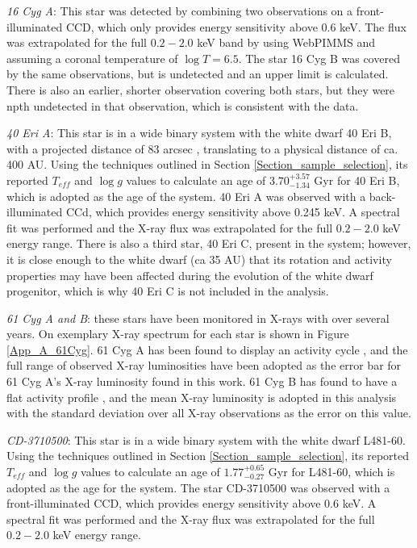 \textit{16 Cyg A}: This star was detected by combining two \Chandra observations on a front-illuminated CCD, which only provides energy sensitivity above 0.6 keV. The flux was extrapolated for the full $0.2 - 2.0$ keV band by using WebPIMMS and assuming a coronal temperature of $\log T = 6.5$. The star 16 Cyg B was covered by the same observations, but is undetected and an upper limit is calculated. There is also an earlier, shorter \XMM observation covering both stars, but they were npth undetected in that observation, which is consistent with the \Chandra data.

\textit{40 Eri A}: This star is in a wide binary system with the white dwarf 40 Eri B, with a projected distance of 83 arcsec \citep{Wenger_etal_2000}, translating to a physical distance of ca. 400 AU. Using the techniques outlined in Section \ref{Section_sample_selection}, its reported $T_{eff}$ and $\log g$ values \citep{Zhao_etal_2012} to calculate an age of $3.70^{+3.57}_{-1.34}$ Gyr for 40 Eri B, which is adopted as the age of the system. 40 Eri A was observed with a back-illuminated \Chandra CCd, which provides energy sensitivity above 0.245 keV. A spectral fit was performed and the X-ray flux was extrapolated for the full $0.2 - 2.0$ keV energy range. There is also a third star, 40 Eri C, present in the system; however, it is close enough to the white dwarf (ca 35 AU) that its rotation and activity properties may have been affected during the evolution of the white dwarf progenitor, which is why 40 Eri C is not included in the analysis.

\textit{61 Cyg A and B}: these stars have been monitored in X-rays with \XMM over several years. On exemplary X-ray spectrum for each star is shown in Figure \ref{App_A_61Cyg}. 61 Cyg A has been found to display an activity cycle \citep{Robrade_etal_2012}, and the full range of observed X-ray luminosities have been adopted as the error bar for 61 Cyg A's X-ray luminosity found in this work. 61 Cyg B has found to have a flat activity profile \citep{Robrade_etal_2012}, and the mean X-ray luminosity is adopted in this analysis with the standard deviation over all X-ray observations as the error on this value.

\textit{CD-3710500}: This star is in a wide binary system with the white dwarf L481-60. Using the techniques outlined in Section \ref{Section_sample_selection}, its reported $T_{eff}$ and $\log g$ values \citep{Zhao_etal_2012} to calculate an age of $1.77^{+0.65}_{-0.27}$ Gyr for L481-60, which is adopted as the age for the system. The star CD-3710500 was observed with a front-illuminated \Chandra CCD, which provides energy sensitivity above 0.6 keV. A spectral fit was performed and the X-ray flux was extrapolated for the full $0.2 - 2.0$ keV energy range.


